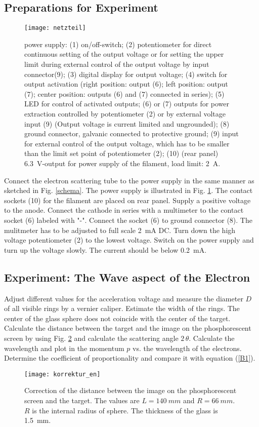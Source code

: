 \documentclass{tudphygp_eng}
\begin{document}
\subsection{Preparations for Experiment}
\begin{figure}[htb]
\centering
\texttt{[image: netzteil]}
\caption{ power supply: (1) on/off-switch; (2) potentiometer for direct continuous setting of the output voltage or for setting the upper limit during external control of the output voltage by input connector(9);
(3) digital display for output voltage; (4) switch for output activation (right position: output (6); left position: output (7); center position: outputs (6) and (7) connected in series);
(5) LED for control of activated outputs; (6) or (7) outputs for power extraction controlled by potentiometer (2) or by external voltage input (9) (Output voltage is current limited and ungrounded); (8) ground connector, galvanic connected to protective ground; (9) input for external control of the output voltage, which has to be smaller than the limit set point of potentiometer (2); (10) (rear panel)
\SI{6,3}{V}-output for power supply of the filament, load limit: \SI{2}{A}.\label{netzteil}}
\end{figure}
Connect the electron scattering tube to the power supply in the same manner as sketched in Fig. \ref{schema}. The power supply is illustrated in Fig. \ref{netzteil}. The contact sockets (10) for the filament are placed on rear panel. Supply a positive voltage to the anode. Connect the cathode in series with a multimeter to the contact socket (6) labeled with "-". Connect the socket (6) to ground connector (8). The mulitmeter has to be adjusted to full scale \SI{2}{mA} DC. Turn down the high voltage potentiometer (2) to the lowest voltage. Switch on the power supply and turn up the voltage slowly. The current should be below \SI{0,2}{mA}.

\subsection{Experiment: The Wave aspect of the Electron}
Adjust different values for the acceleration voltage and measure the diameter $D$ of all visible rings by a vernier caliper. Estimate the width of the rings. The center of the glass sphere does not coincide with the center of the target. Calculate the distance between the target and the image on the phosphorescent screen by using Fig. \ref{korrektur} and calculate the scattering angle $2\,\theta$. Calculate the wavelength and plot in the momentum $p$ vs. the wavelength of the electrons. Determine the coefficient of proportionality and compare it with equation (\ref{B1}).
\begin{figure}[h]
\centering
\texttt{[image: korrektur\_en]}
\caption{Correction of the distance between the image on the phosphorescent screen and the target. The values are $L=\SI{140}{mm}$ and $R=\SI{66}{mm}$. $R$ is the internal radius of sphere. The thickness of the glass is \SI{1,5}{mm}.
\label{korrektur}}
\end{figure}
\end{document}
